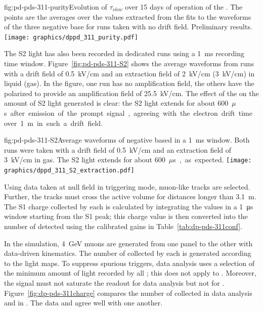 \begin{dunefigure}{fig:pd-pds-311-purity}{Evolution of $\tau_{slow}$ over \num{15} days of operation of the . The points are the averages over the values extracted from the fits to the waveforms of the three negative base  for runs taken with no drift field. Preliminary results.}
\texttt{[image: graphics/dppd\_311\_purity.pdf]}
\end{dunefigure}

The S2 light has also been recorded in dedicated runs using a \SI{1}{ms} recording time window.
Figure~\ref{fig:pd-pds-311-S2} shows the average waveforms from runs with a drift field of \SI{0.5}{kV/cm} and an extraction field of \SI{2}{kV/cm} (\SI{3}{kV/cm}) in liquid (gas). In the figure, one run has no amplification field, the others have the  polarized to provide an amplification field of \SI{25.5}{kV/cm}. 
The effect of the  on the amount of S2 light generated is clear: 
the S2 light extends for about \SI{600}{$\mu$s} after emission of the prompt signal, agreeing with the electron drift time over \SI{1}{m} in such a drift field.

\begin{dunefigure}{fig:pd-pds-311-S2}{Average waveforms of negative based  in a \SI{1}{ms} window. Both runs were taken with a drift field of \SI{0.5}{kV/cm} and an extraction field of \SI{3}{kV/cm} in gas. The S2 light extends for about \SI{600}{$\mu$s}, as expected.}
\texttt{[image: graphics/dppd\_311\_S2\_extraction.pdf]}
\end{dunefigure}
Using data taken at null field in  triggering mode, muon-like tracks are selected. Further, the tracks must cross the active volume for distances longer than \SI{3.1}{\m}. 
The S1 charge collected by each  is calculated by integrating the  values in a \SI{1}{\us} window starting from the S1 peak; this charge value is then converted into the number of detected  using the calibrated  gains in Table~\ref{tab:dp-pds-311conf}.

In the simulation, \SI{4}{\GeV} muons are generated from one  panel to the other with data-driven kinematics. The number of  collected by each  is generated according to the light maps. To suppress spurious triggers, data analysis uses a selection of the minimum amount of light recorded by all ; this does not apply to . Moreover, the  signal must not saturate the readout %
for data analysis but not for . Figure~\ref{fig:dp-pds-311charge} compares the number of  collected in data analysis and in . The data and  agree well with one another. 

